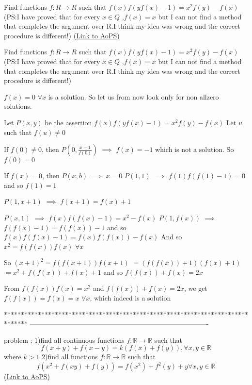 \begin{problem}
	Find functions $f:R \rightarrow R$ such that 
$f(x)f(yf(x)-1)=x^2f(y)-f(x)$
(PS:I have proved that for every $x \in Q$ ,$f(x)=x$ but I can not find a method that completes the argument over R.I think my idea was wrong and the correct procedure is different!)
	\flushright \href{https://artofproblemsolving.com/community/c6h561433}{(Link to AoPS)}
\end{problem}



\begin{solution}
	\begin{tcolorbox}Find functions $f:R \rightarrow R$ such that 
$f(x)f(yf(x)-1)=x^2f(y)-f(x)$
(PS:I have proved that for every $x \in Q$ ,$f(x)=x$ but I can not find a method that completes the argument over R.I think my idea was wrong and the correct procedure is different!)\end{tcolorbox}
$\boxed{f(x)=0}$ $\forall x$ is a solution. So let us from now look only for non allzero solutions.

Let $P(x,y)$ be the assertion $f(x)f(yf(x)-1)=x^2f(y)-f(x)$
Let $u$ such that $f(u)\ne 0$

If $f(0)\ne 0$, then $P(0,\frac {x+1}{f(0)})$ $\implies$ $f(x)=-1$ which is not a solution. So $f(0)=0$

If $f(x)=0$, then $P(x,b)$ $\implies$ $x=0$
$P(1,1)$ $\implies$ $f(1)f(f(1)-1)=0$ and so $f(1)=1$

$P(1,x+1)$ $\implies$ $f(x+1)=f(x)+1$

$P(x,1)$ $\implies$ $f(x)f(f(x)-1)=x^2-f(x)$
$P(1,f(x))$ $\implies$ $f(f(x)-1)=f(f(x))-1$ and so $f(x)f(f(x)-1)=f(x)f(f(x))-f(x)$
And so $x^2=f(f(x))f(x)$ $\forall x$

So $(x+1)^2=f(f(x+1))f(x+1)$ $=(f(f(x))+1)(f(x)+1)$ $=x^2+f(f(x))+f(x)+1$ and so $f(f(x))+f(x)=2x$

From $f(f(x))f(x)=x^2$ and $f(f(x))+f(x)=2x$, we get $f(f(x))=\boxed{f(x)=x}$ $\forall x$, which indeed is a solution
\end{solution}
*******************************************************************************
-------------------------------------------------------------------------------

\begin{problem}
	problem :
1)find all continuous functions $f:\mathbb{R}\to\mathbb{R}$ such that 
\[f(x+y)+f(x-y)=k(f(x)+f(y)),\forall x,y\in\mathbb{R}\]where $k> 1$
2)find all  functions $f:\mathbb{R}\to\mathbb{R}$ such that 
\[f(x^2+f(xy)+f(y))=f(x^2)+f^2(y) +y\forall x,y\in\mathbb{R}\]
	\flushright \href{https://artofproblemsolving.com/community/c6h561500}{(Link to AoPS)}
\end{problem}



